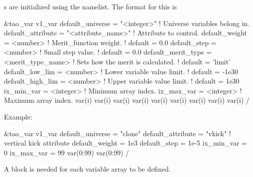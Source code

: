 {{s are initialized using the  namelist. The
format for this is
\begin{example}
  \&tao_var
    v1_var%
    default_universe   = "<integer>"         ! Universe variables belong in.
    default_attribute  = "<attribute_name>"  ! Attribute to control.
    default_weight     = <number>            ! Merit_function weight.
                                             ! default = 0.0
    default_step       = <number>            ! Small step value.
                                             ! default = 0.0
    default_merit_type = <merit_type_name>   ! Sets how the merit is calculated.
                                             ! default = 'limit'
    default_low_lim    = <number>            ! Lower variable value limit. 
                                             ! default = -1e30
    default_high_lim   = <number>            ! Upper variable value limit. 
                                             ! default =  1e30
    ix_min_var         = <integer>           ! Minimum array index.
    ix_max_var         = <integer>           ! Maximum array index.
    var(i)%
    var(i)%
    var(i)%
    var(i)%
    var(i)%
    var(i)%
    var(i)%
    var(i)%
    var(i)%
  /
\end{example}
Example:
\begin{example}
  \&tao_var
    v1_var%
    default_universe  = "clone"
    default_attribute = "vkick"     ! vertical kick attribute
    default_weight    = 1e3
    default_step      = 1e-5
    ix_min_var        = 0
    ix_max_var        = 99
    var(0:99)%
    var(0:99)%
  /
\end{example}

A  block is needed for each variable array to be defined.
\vn{v1_var%
commands. The \vn{var(i)} array of variables has an index \vn{i} that runs
from \vn{ix_min_var} to \vn{ix_max_var}. Each variable has a name 
\vn{var(i)%
A lattice element name \vn{var(i)%
\vn{var(i)%
\vn{exist} and the element names of non--existant elements should be undefined
or set to a name with only spaces in it. For those variables where
\vn{var(i)%
will be used. 


}}}}}}}
